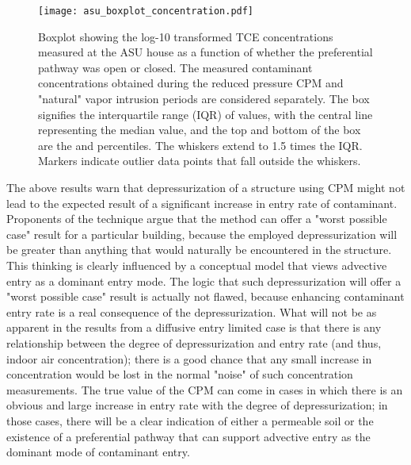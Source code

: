 \begin{figure}[htb!]
  \centering
  \texttt{[image: asu\_boxplot\_concentration.pdf]}
  \caption[Boxplot showing the log-10 transformed TCE concentrations measured at the ASU house as a function of whether the preferential pathway was open or closed.]{Boxplot showing the log-10 transformed TCE concentrations measured at the ASU house as a function of whether the preferential pathway was open or closed. The measured contaminant concentrations obtained during the reduced pressure CPM and "natural" vapor intrusion periods are considered separately. The box signifies the interquartile range (IQR) of values, with the central line representing the median value, and the top and bottom of the box are the  and  percentiles. The whiskers extend to 1.5 times the IQR. Markers indicate outlier data points that fall outside the whiskers.}
  \label{fig:cpm_adv_diff}
\end{figure}

The above results warn that depressurization of a structure using CPM might not lead to the expected result of a significant increase in entry rate of contaminant.
Proponents of the technique argue that the method can offer a "worst possible case" result for a particular building, because the employed depressurization will be greater than anything that would naturally be encountered in the structure.
This thinking is clearly influenced by a conceptual model that views advective entry as a dominant entry mode.
The logic that such depressurization will offer a "worst possible case" result is actually not flawed, because enhancing contaminant entry rate is a real consequence of the depressurization.
What will not be as apparent in the results from a diffusive entry limited case is that there is any relationship between the degree of depressurization and entry rate (and thus, indoor air concentration); there is a good chance that any small increase in concentration would be lost in the normal "noise" of such concentration measurements.
The true value of the CPM can come in cases in which there is an obvious and large increase in entry rate with the degree of depressurization; in those cases, there will be a clear indication of either a permeable soil or the existence of a preferential pathway that can support advective entry as the dominant mode of contaminant entry.\par

